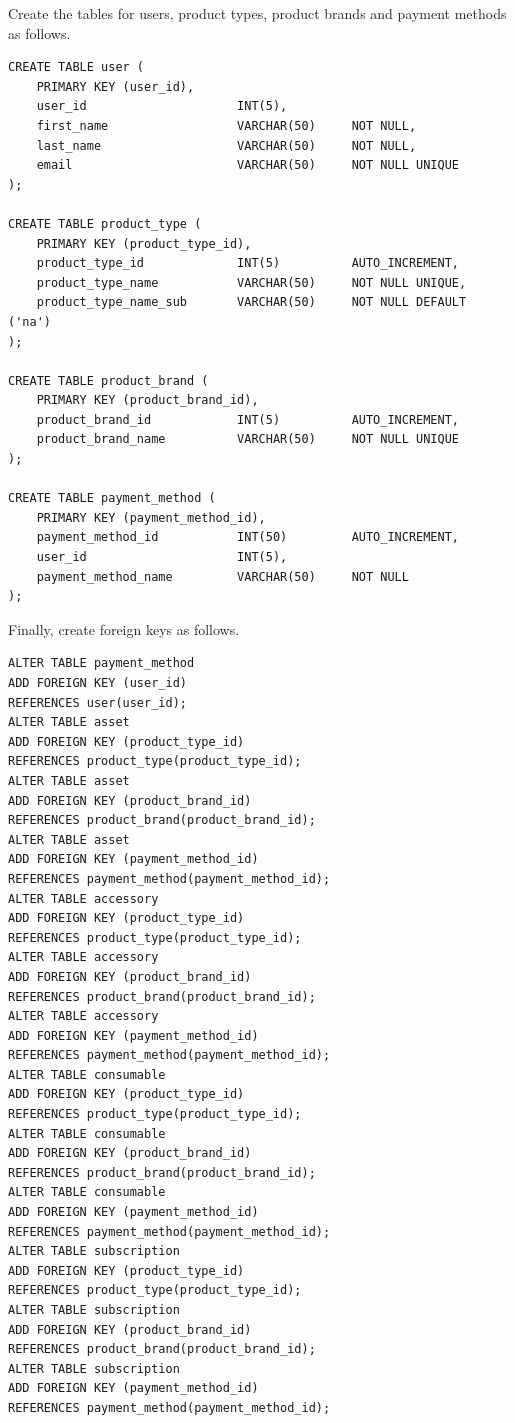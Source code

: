 Create the tables for users, product types, product brands and payment methods as follows.
\begin{lstlisting}
CREATE TABLE user (
	PRIMARY KEY (user_id),
	user_id                     INT(5),
	first_name                  VARCHAR(50)     NOT NULL,
	last_name                   VARCHAR(50)     NOT NULL,
	email                       VARCHAR(50)     NOT NULL UNIQUE
);
	
CREATE TABLE product_type (
	PRIMARY KEY (product_type_id),
	product_type_id             INT(5)          AUTO_INCREMENT,
	product_type_name           VARCHAR(50)     NOT NULL UNIQUE,
	product_type_name_sub       VARCHAR(50)     NOT NULL DEFAULT ('na')
);
	
CREATE TABLE product_brand (
	PRIMARY KEY (product_brand_id),
	product_brand_id            INT(5)          AUTO_INCREMENT,
	product_brand_name          VARCHAR(50)     NOT NULL UNIQUE
);
	
CREATE TABLE payment_method (
	PRIMARY KEY (payment_method_id),
	payment_method_id           INT(50)         AUTO_INCREMENT,
	user_id                     INT(5),
	payment_method_name         VARCHAR(50)     NOT NULL
);
\end{lstlisting}

Finally, create foreign keys as follows.
\begin{lstlisting}
ALTER TABLE payment_method
ADD FOREIGN KEY (user_id)
REFERENCES user(user_id);
ALTER TABLE asset
ADD FOREIGN KEY (product_type_id)
REFERENCES product_type(product_type_id);
ALTER TABLE asset
ADD FOREIGN KEY (product_brand_id)
REFERENCES product_brand(product_brand_id);
ALTER TABLE asset
ADD FOREIGN KEY (payment_method_id)
REFERENCES payment_method(payment_method_id);
ALTER TABLE accessory
ADD FOREIGN KEY (product_type_id)
REFERENCES product_type(product_type_id);
ALTER TABLE accessory
ADD FOREIGN KEY (product_brand_id)
REFERENCES product_brand(product_brand_id);
ALTER TABLE accessory
ADD FOREIGN KEY (payment_method_id)
REFERENCES payment_method(payment_method_id);
ALTER TABLE consumable
ADD FOREIGN KEY (product_type_id)
REFERENCES product_type(product_type_id);
ALTER TABLE consumable
ADD FOREIGN KEY (product_brand_id)
REFERENCES product_brand(product_brand_id);
ALTER TABLE consumable
ADD FOREIGN KEY (payment_method_id)
REFERENCES payment_method(payment_method_id);
ALTER TABLE subscription
ADD FOREIGN KEY (product_type_id)
REFERENCES product_type(product_type_id);
ALTER TABLE subscription
ADD FOREIGN KEY (product_brand_id)
REFERENCES product_brand(product_brand_id);
ALTER TABLE subscription
ADD FOREIGN KEY (payment_method_id)
REFERENCES payment_method(payment_method_id);
\end{lstlisting}

